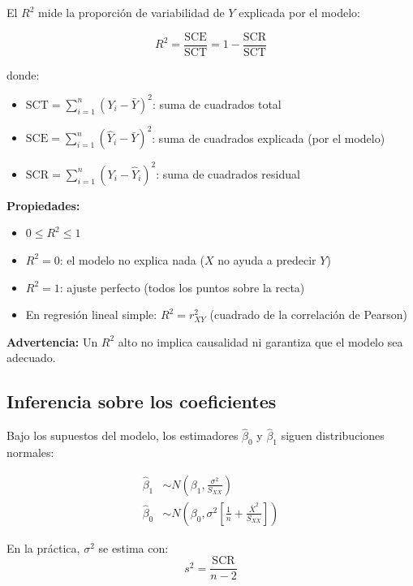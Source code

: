 \documentclass[11pt,a4paper]{article}
\begin{document}
El $R^2$ mide la proporción de variabilidad de $Y$ explicada por el modelo:

\begin{equation}
R^2 = \frac{\text{SCE}}{\text{SCT}} = 1 - \frac{\text{SCR}}{\text{SCT}}
\end{equation}

donde:
\begin{itemize}
    \item $\text{SCT} = \sum_{i=1}^{n} (Y_i - \bar{Y})^2$: suma de cuadrados total
    \item $\text{SCE} = \sum_{i=1}^{n} (\hat{Y}_i - \bar{Y})^2$: suma de cuadrados explicada (por el modelo)
    \item $\text{SCR} = \sum_{i=1}^{n} (Y_i - \hat{Y}_i)^2$: suma de cuadrados residual
\end{itemize}

\textbf{Propiedades:}
\begin{itemize}
    \item $0 \leq R^2 \leq 1$
    \item $R^2 = 0$: el modelo no explica nada ($X$ no ayuda a predecir $Y$)
    \item $R^2 = 1$: ajuste perfecto (todos los puntos sobre la recta)
    \item En regresión lineal simple: $R^2 = r_{XY}^2$ (cuadrado de la correlación de Pearson)
\end{itemize}

\textbf{Advertencia:} Un $R^2$ alto no implica causalidad ni garantiza que el modelo sea adecuado.

\subsection{Inferencia sobre los coeficientes}

Bajo los supuestos del modelo, los estimadores $\hat{\beta}_0$ y $\hat{\beta}_1$ siguen distribuciones normales:

\begin{align}
\hat{\beta}_1 &\sim N\left(\beta_1, \frac{\sigma^2}{S_{XX}}\right) \\
\hat{\beta}_0 &\sim N\left(\beta_0, \sigma^2 \left[\frac{1}{n} + \frac{\bar{X}^2}{S_{XX}}\right]\right)
\end{align}

En la práctica, $\sigma^2$ se estima con:
\begin{equation}
s^2 = \frac{\text{SCR}}{n - 2}
\end{equation}
\end{document}
